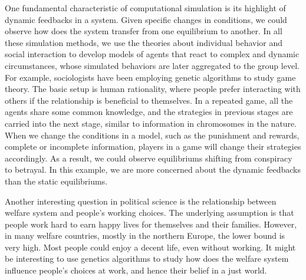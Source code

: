 \documentclass[letterpaper,12pt]{article}
\theoremstyle{definition}
\begin{document}
One fundamental characteristic of computational simulation is its highlight of dynamic feedbacks in a system. Given specific changes in conditions, we could observe how does the system transfer from one equilibrium to another. In all these simulation methods, we use the theories about individual behavior and social interaction to develop models of agents that react to complex and dynamic circumstances, whose simulated behaviors are later aggregated to the group level. For example, sociologists have been employing genetic algorithms to study game theory. The basic setup is human rationality, where people prefer interacting with others if the relationship is beneficial to themselves. In a repeated game, all the agents share some common knowledge, and the strategies in previous stages are carried into the next stage, similar to information in chromosomes in the nature. When we change the conditions in a model, such as the punishment and rewards, complete or incomplete information, players in a game will change their strategies accordingly. As a result, we could observe equilibriums shifting from conspiracy to betrayal. In this example, we are more concerned about the dynamic feedbacks than the static equilibriums.

Another interesting question in political science is the relationship between welfare system and people's working choices. The underlying assumption is that people work hard to earn happy lives for themselves and their families. However, in many welfare countries, mostly in the northern Europe, the lower bound is very high. Most people could enjoy a decent life, even without working. It might be interesting to use genetics algorithms to study how does the welfare system influence people's choices at work, and hence their belief in a just world. 
\end{document}
